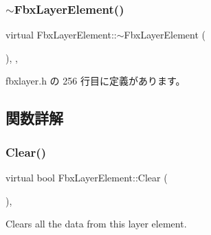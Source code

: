 \subsubsection{\texorpdfstring{$\sim$\+Fbx\+Layer\+Element()}{~FbxLayerElement()}}
{\footnotesize\ttfamily virtual Fbx\+Layer\+Element\+::$\sim$\+Fbx\+Layer\+Element (\begin{DoxyParamCaption}{ }\end{DoxyParamCaption})\hspace{0.3cm}{\ttfamily [inline]}, {\ttfamily [protected]}, {\ttfamily [virtual]}}



 fbxlayer.\+h の 256 行目に定義があります。



\subsection{関数詳解}
\mbox{\label{class_fbx_layer_element_a6ab41d0a26802a359efbbc3b2b12dd3d}} 
\subsubsection{\texorpdfstring{Clear()}{Clear()}}
{\footnotesize\ttfamily virtual bool Fbx\+Layer\+Element\+::\+Clear (\begin{DoxyParamCaption}{ }\end{DoxyParamCaption})\hspace{0.3cm}{\ttfamily [inline]}, {\ttfamily [virtual]}}



Clears all the data from this layer element. 



